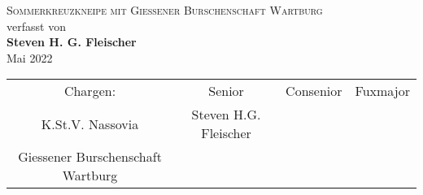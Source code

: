 \documentclass[%
	BCOR=8.25mm,         %
	DIV=12,              %
	parskip=half,				 %
	bibliography=totoc,	 %
	headsepline=on,      %
	]{scrbook}
\begin{document}
\frontmatter

\begin{titlepage}
	\begin{center}
	\textsc{\Large Sommerkreuzkneipe mit Giessener Burschenschaft Wartburg}\\[2cm]
	verfasst von\\
	\textbf{Steven H. G. Fleischer}\\ [1.5cm] 
	Mai 2022
	\end{center}
	\vfill
	\begin{tabular}{cccc}
		Chargen: & Senior & Consenior & Fuxmajor\\
		K.St.V. Nassovia & Steven H.G. Fleischer &  &  \\
		Giessener Burschenschaft Wartburg &  &  
	\end{tabular}
\end{titlepage}

\tableofcontents

\mainmatter 
\pagestyle{headings}




\end{document}
